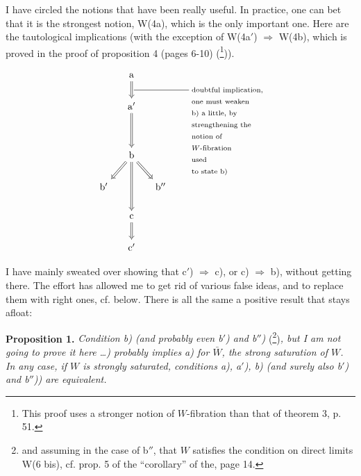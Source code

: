 \documentclass[11pt]{article}
\newcommand{\printedpage}[1]{\marginpar{\footnotesize p.~#1}}
\newcommand{\msp}[1]{\marginpar{\footnotesize [#1]}}
\begin{document}
\msp{page 54}

I have circled the notions that have been really useful. In practice, one can bet that it is the strongest notion, W(4a), which is the only important one. Here are the tautological implications (with the exception of W(4a$'$) $\Longrightarrow$ W(4b), which is proved in the proof of proposition 4 (pages 6-10) (\footnote[61]{This proof uses a stronger notion of $W$-fibration than that of theorem 3, p. 51.})).

\printedpage{40}

\[
\begin{tikzcd}[column sep=small]
& \mathrm{a} \arrow[d,Rightarrow] & \\
& \mathrm{a}' \arrow[dd,Rightarrow,"{\text{\rule[0.6ex]{2cm}{0.4pt}\ \begin{tabular}[t]{@{}l@{}}doubtful implication,\\ one must weaken\\ b) a little, by\\ strengthening the\\ notion of\\ $W$-fibration\\ used\\ to state b)\end{tabular}}}"] & \\
& & \\
& \mathrm{b} \arrow[dl,Rightarrow] \arrow[dr,Rightarrow] \arrow[dd,Rightarrow] & \\
\mathrm{b}' & & \mathrm{b}'' \\
& \mathrm{c} \arrow[d,Rightarrow] & \\
& \mathrm{c}' &
\end{tikzcd}
\]

I have mainly sweated over showing that c$'$) $\Longrightarrow$ c), or c) $\Longrightarrow$ b), without getting there. The effort has allowed me to get rid of various false ideas, and to replace them with right ones, cf. below. There is all the same a positive result that stays afloat:

\textbf{Proposition 1.} \textit{Condition b) (and probably even b$'$) and b$''$)} (\footnote[62]{and assuming in the case of b$''$, that $W$ satisfies the condition on direct limits W(6 bis), cf. prop. 5 of the ``corollary'' of the, page 14.})\textit{, but I am not going to prove it here \dots) probably implies a) for $\bar{W}$, the strong saturation of $W$. In any case, if $W$ is strongly saturated, conditions a), a$'$), b) (and surely also b$'$) and b$''$)) are equivalent.}
\end{document}
